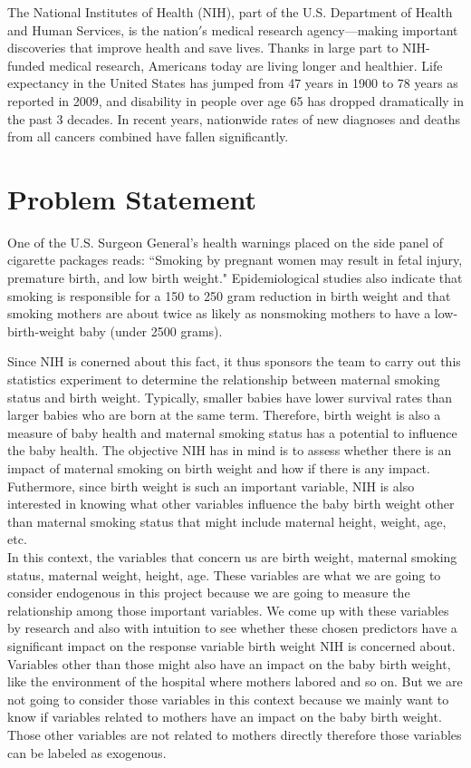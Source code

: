\documentclass[oneside,12pt]{report}
\begin{document}
The National Institutes of Health (NIH), part of the U.S. Department of Health and Human Services, is the nation$'$s medical research agency---making important discoveries that improve health and save lives. Thanks in large part to NIH-funded medical research, Americans today are living longer and healthier. Life expectancy in the United States has jumped from 47 years in 1900 to 78 years as reported in 2009, and disability in people over age 65 has dropped dramatically in the past 3 decades. In recent years, nationwide rates of new diagnoses and deaths from all cancers combined have fallen significantly. 

%
%

\chapter{Problem Statement}\label{Problem Statement}

One of the U.S. Surgeon General’s health warnings placed on the side panel of cigarette packages reads: ``Smoking by pregnant women may result in fetal injury, premature birth, and low birth weight." Epidemiological studies \cite{MT90} also indicate that smoking is responsible for a 150 to 250 gram reduction in birth weight and that smoking mothers are about twice as likely as nonsmoking mothers to have a low-birth-weight baby (under 2500 grams). 

\indent Since NIH is conerned about this fact, it thus sponsors the team to carry out this statistics experiment to determine the relationship between maternal smoking status and birth weight. Typically, smaller babies have lower survival rates than larger babies who are born at the same term. Therefore, birth weight is also a measure of baby health and maternal smoking status has a potential to influence the baby health. The objective NIH has in mind is to assess whether there is an impact of maternal smoking on birth weight and how if there is any impact. Futhermore, since birth weight is such an important variable, NIH is also interested in knowing what other variables influence the baby birth weight other than maternal smoking status that might include maternal height, weight, age, etc.\\
\indent In this context, the variables that concern us are birth weight, maternal smoking status, maternal weight, height, age. These variables are what we are going to consider endogenous in this project because we are going to measure the relationship among those important variables. We come up with these variables by research and also with intuition to see whether these chosen predictors have a significant impact on the response variable birth weight NIH is concerned about. Variables other than those might also have an impact on the baby birth weight, like the environment of the hospital where mothers labored and so on. But we are not going to consider those variables in this context because we mainly want to know if variables related to mothers have an impact on the baby birth weight. Those other variables are not related to mothers directly therefore those variables can be labeled as exogenous. 
\end{document}
